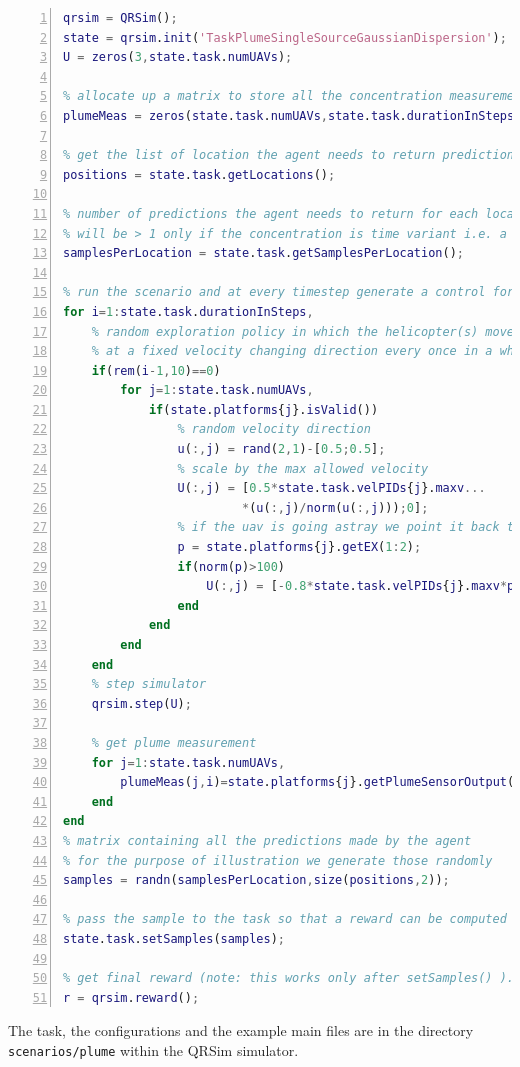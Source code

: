 \documentclass[a4paper,11pt]{report}
\newcommand{\sname}{QRSim\xspace}
\newcommand\mytexttt[1]{\texttt{\hyphenchar\font=45\relax #1}}
\begin{document}
\begin{lstlisting}[float=ht!bp,caption=main\_plume.m,language=Matlab,frame=lines,label=lst:mpl,numbers=left,basicstyle=\small]
% create simulator object and load task parameters
qrsim = QRSim();
state = qrsim.init('TaskPlumeSingleSourceGaussianDispersion');
U = zeros(3,state.task.numUAVs);

% allocate up a matrix to store all the concentration measurements
plumeMeas = zeros(state.task.numUAVs,state.task.durationInSteps);

% get the list of location the agent needs to return predictions at.
positions = state.task.getLocations();

% number of predictions the agent needs to return for each location,
% will be > 1 only if the concentration is time variant i.e. a puff model
samplesPerLocation = state.task.getSamplesPerLocation();

% run the scenario and at every timestep generate a control for each uav
for i=1:state.task.durationInSteps,    
    % random exploration policy in which the helicopter(s) moves around
    % at a fixed velocity changing direction every once in a while 
    if(rem(i-1,10)==0)
        for j=1:state.task.numUAVs,
            if(state.platforms{j}.isValid())                
                % random velocity direction
                u(:,j) = rand(2,1)-[0.5;0.5];            
                % scale by the max allowed velocity
                U(:,j) = [0.5*state.task.velPIDs{j}.maxv...
                         *(u(:,j)/norm(u(:,j)));0];                                
                % if the uav is going astray we point it back to the center
                p = state.platforms{j}.getEX(1:2);
                if(norm(p)>100)
                    U(:,j) = [-0.8*state.task.velPIDs{j}.maxv*p/norm(p);0];
                end    
            end
        end
    end    
    % step simulator
    qrsim.step(U);

    % get plume measurement
    for j=1:state.task.numUAVs,
        plumeMeas(j,i)=state.platforms{j}.getPlumeSensorOutput();
    end
end
% matrix containing all the predictions made by the agent
% for the purpose of illustration we generate those randomly 
samples = randn(samplesPerLocation,size(positions,2));

% pass the sample to the task so that a reward can be computed
state.task.setSamples(samples);

% get final reward (note: this works only after setSamples() ).
r = qrsim.reward();
\end{lstlisting}
The task, the configurations and the example main files are in the directory \mytexttt{scenarios/plume} within the \sname simulator. 
\end{document}
